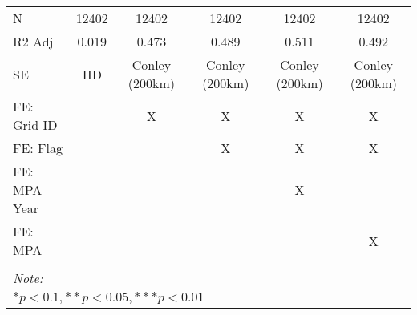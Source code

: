 \begin{table}
\begin{tabular}[t]{lccccc}
\hspace{1em}N & 12402 & 12402 & 12402 & 12402 & 12402\\
\hspace{1em}R2 Adj & 0.019 & 0.473 & 0.489 & 0.511 & 0.492\\
\hspace{1em}SE & IID & Conley (200km) & Conley (200km) & Conley (200km) & Conley (200km)\\
\midrule
FE: Grid ID &  & X & X & X & X\\
FE: Flag &  &  & X & X & X\\
FE: MPA-Year &  &  &  & X & \\
FE: MPA &  &  &  &  & X\\
\midrule\\
\bottomrule
\multicolumn{6}{l}{\rule{0pt}{1em}\textit{Note: }}\\
\multicolumn{6}{l}{\rule{0pt}{1em}$* p < 0.1, ** p < 0.05, *** p < 0.01$}\\
\end{tabular}
\end{table}